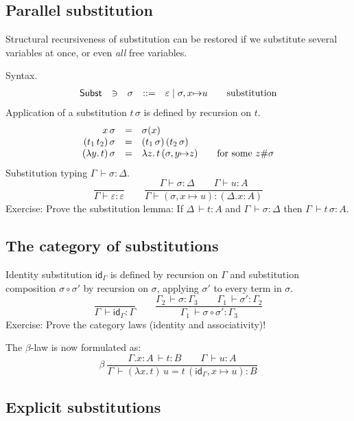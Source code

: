 \documentclass[a4paper,fleqn]{scrartcl}
\newcommand{\tid}{\mathsf{id}}
\newcommand{\comp}{\circ}
\newcommand{\der}{\,\vdash}
\newcommand{\ru}[2]{\dfrac{#1}{#2}}
\newcommand{\nru}[3]{#1\ \ru{#2}{#3}}
\newcommand{\Subst}{\mathsf{Subst}}
\newcommand{\GD}{\ensuremath{\Delta}}
\newcommand{\Ge}{\ensuremath{\varepsilon}}
\newcommand{\Gs}{\ensuremath{\sigma}}
\begin{document}
\subsection{Parallel substitution}

Structural recursiveness of substitution can be restored if we substitute several variables at once, or even \emph{all} free variables.

\noindent
Syntax.
\[
\begin{array}{lllrl@{\qquad}l}
\Subst & \ni & \sigma & ::= & \varepsilon \mid \sigma,x{\mapsto}u
  & \mbox{substitution} \\
\end{array}
\]
Application of a substitution $t\,\sigma$ is defined by recursion on $t$.
\[
\begin{array}{rll@{\qquad}l}
  x\,\sigma & = & \sigma(x) \\
  (t_1\,t_2)\,\sigma & = & (t_1\,\sigma)\,(t_2\,\sigma) \\
  (\lambda y.\,t)\,\sigma & = & \lambda z.\,t\,(\sigma, y{\mapsto}z)
    & \mbox{for some } z \# \sigma \\
\end{array}
\]
Substitution typing $\Gamma \der \sigma : \Delta$.
\[
  \ru{}{\Gamma \vdash \Ge : \Ge}
\qquad
  \ru{\Gamma \vdash \Gs : \GD \qquad \Gamma \vdash u : A
     }{\Gamma \vdash (\Gs,x{\mapsto}u) : (\GD.x{:}A)
     }
\]
Exercise: Prove the substitution lemma:
If $\Delta \der t : A$ and $\Gamma \der \Gs : \Delta$
then $\Gamma \der t\,\Gs : A$.

\subsection{The category of substitutions}

Identity substitution $\tid_\Gamma$ is defined by recursion on $\Gamma$ and substitution composition $\sigma\comp\sigma'$ by recursion on $\sigma$, applying $\sigma'$ to every term in $\sigma$.
\[
  \ru{}{\Gamma \der \tid_\Gamma : \Gamma}
  \qquad
  \ru{\Gamma_2 \der \sigma : \Gamma_3 \qquad
      \Gamma_1 \der \sigma' : \Gamma_2
    }{\Gamma_1 \der \sigma\comp\sigma' : \Gamma_3}
\]
Exercise: Prove the category laws (identity and associativity)!

The $\beta$-law is now formulated as:
\[
  \nru{\beta
    }{\Gamma.x{:}A \der t : B \qquad \Gamma \der u : A
    }{\Gamma \der (\lambda x.\,t)\,u = t\,(\tid_\Gamma,x{\mapsto}u) : B
    }
\]

\subsection{Explicit substitutions}
\end{document}
